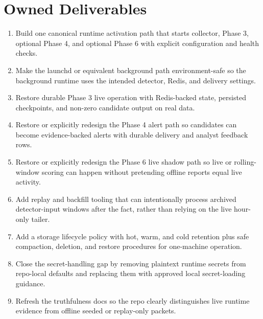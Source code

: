\documentclass{article}
\begin{document}
\section*{Owned Deliverables}
\begin{enumerate}
\item Build one canonical runtime activation path that starts collector, Phase 3, optional Phase 4, and optional Phase 6 with explicit configuration and health checks.
\item Make the launchd or equivalent background path environment-safe so the background runtime uses the intended detector, Redis, and delivery settings.
\item Restore durable Phase 3 live operation with Redis-backed state, persisted checkpoints, and non-zero candidate output on real data.
\item Restore or explicitly redesign the Phase 4 alert path so candidates can become evidence-backed alerts with durable delivery and analyst feedback rows.
\item Restore or explicitly redesign the Phase 6 live shadow path so live or rolling-window scoring can happen without pretending offline reports equal live activity.
\item Add replay and backfill tooling that can intentionally process archived detector-input windows after the fact, rather than relying on the live hour-only tailer.
\item Add a storage lifecycle policy with hot, warm, and cold retention plus safe compaction, deletion, and restore procedures for one-machine operation.
\item Close the secret-handling gap by removing plaintext runtime secrets from repo-local defaults and replacing them with approved local secret-loading guidance.
\item Refresh the truthfulness docs so the repo clearly distinguishes live runtime evidence from offline seeded or replay-only packets.
\end{enumerate}
\end{document}
